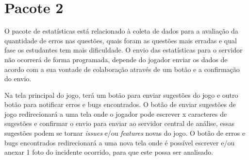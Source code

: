 \begin{comment}
\subsection[Módulo 3]{Módulo 3}
– Jogo de classificação, perguntar técnica de resolução a ser utilizada em cada equação.

\end{comment}

\section[Pacote 2]{Pacote 2}
O pacote de estatísticas está relacionado à coleta de dados para a avaliação da quantidade de erros nas questões, quais foram as questões mais erradas e qual fase os estudantes tem mais dificuldade. O envio das estatísticas para o servidor não ocorrerá de forma programada, depende do jogador enviar os dados de acordo com a sua vontade de colaboração através de um botão e a confirmação do envio.


Na tela principal do jogo, terá um botão para enviar sugestões do jogo e outro botão para notificar erros e bugs encontrados.
O botão de enviar sugestões de jogo redirecionará a uma tela onde o jogador pode escrever x caracteres de sugestões e confirmar o envio para enviar ao servidor central de análise, essas sugestões podem se tornar \textit{issues} e/ou \textit{features} novas do jogo.
O botão de erros e bugs encontrados redirecionará a uma nova tela onde é possível escrever e/ou anexar 1 foto do incidente ocorrido, para que este possa ser analisado.

